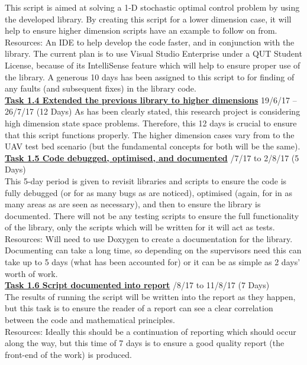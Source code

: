 \documentclass[11pt,draftd]{article}
\begin{document}
\begin{appendices}
	This script is aimed at solving a 1-D stochastic optimal control problem by using the developed library. By creating this script for a lower dimension case, it will help to ensure higher dimension scripts have an example to follow on from. \\
	Resources: An IDE to help develop the code faster, and in conjunction with the library. The current plan is to use Visual Studio Enterprise under a QUT Student License, because of its IntelliSense feature which will help to ensure proper use of the library. A generous 10 days has been assigned to this script to for finding of any faults (and subsequent fixes) in the library code. \\
	
	\noindent\underline{\textbf{Task 1.4 Extended the previous library to higher dimensions}}
	19/6/17 -- 26/7/17 (12 Days)
	As has been clearly stated, this research project is considering high dimension state space problems. Therefore, this 12 days is crucial to ensure that this script functions properly. The higher dimension cases vary from \cite{zylong} to the UAV test bed scenario (but the fundamental concepts for both will be the same).\\
	
	\noindent\underline{\textbf{Task 1.5 Code debugged, optimised, and documented}} /7/17 to 2/8/17 (5 Days) \\
	
	This 5-day period is given to revisit libraries and scripts to ensure the code is fully debugged (or for as many bugs as are noticed), optimised (again, for in as many areas as are seen as necessary), and then to ensure the library is documented. There will not be any testing scripts to ensure the full functionality of the library, only the scripts which will be written for it will act as tests. \\
	Resources: Will need to use Doxygen to create a documentation for the library. Documenting can take a long time, so depending on the supervisors need this can take up to 5 days (what has been accounted for) or it can be as simple as 2 days’ worth of work.\\
	
	\noindent\underline{\textbf{Task 1.6 Script documented into report}} /8/17 to 11/8/17 (7 Days) \\
	
	The results of running the script will be written into the report as they happen, but this task is to ensure the reader of a report can see a clear correlation between the code and mathematical principles. \\
	Resources: Ideally this should be a continuation of reporting which should occur along the way, but this time of 7 days is to ensure a good quality report (the front-end of the work) is produced.
	

\end{appendices}
\end{document}
